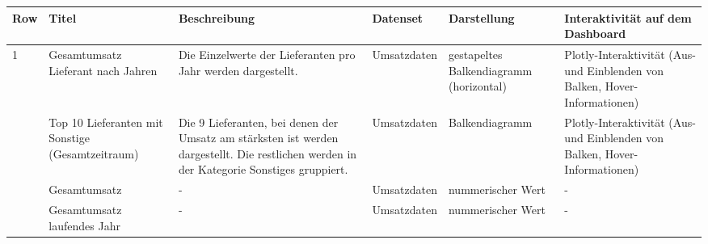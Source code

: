     \begingroup
    \setlength{\tabcolsep}{12pt} %
    \renewcommand{\arraystretch}{1.5} 
    \begin{table}[H]
        \centering
        \begin{adjustbox}{max width=\textwidth}
        \begin{tabular}{p{}p{}p{}p{}p{}p{}}
           \toprule
           Row        &Titel &Beschreibung &Datenset &Darstellung &Interaktivität auf dem Dashboard\\
           \midrule
            1           &Gesamtumsatz Lieferant nach Jahren &Die Einzelwerte der Lieferanten pro Jahr werden dargestellt.   &Umsatzdaten    &gestapeltes Balkendiagramm (horizontal)    &Plotly-Interaktivität (Aus- und Einblenden von Balken, Hover-Informationen)\\
                        &Top 10 Lieferanten mit Sonstige (Gesamtzeitraum)   &Die 9 Lieferanten, bei denen der Umsatz am stärksten ist werden dargestellt. Die restlichen werden in der Kategorie Sonstiges gruppiert.   &Umsatzdaten    &Balkendiagramm    &Plotly-Interaktivität (Aus- und Einblenden von Balken, Hover-Informationen)\\
                        &Gesamtumsatz&-&Umsatzdaten    &nummerischer Wert   &-\\
                        &Gesamtumsatz laufendes Jahr&-&Umsatzdaten    &nummerischer Wert   &-\\
            

\end{tabular}
\end{adjustbox}
\end{table}
